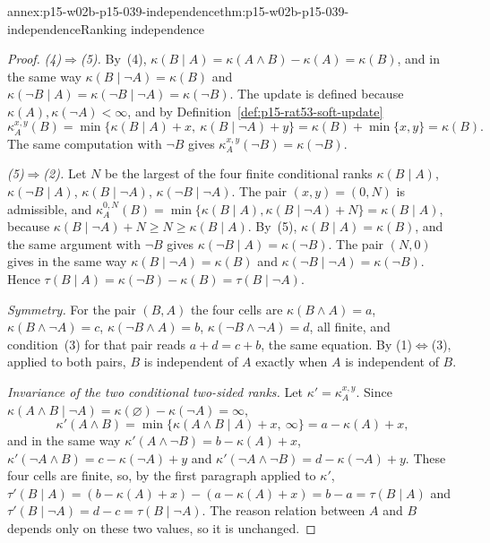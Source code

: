 \begin{annexitem}{annex:p15-w02b-p15-039-independence}{thm:p15-w02b-p15-039-independence}{Ranking independence}
\begin{proof}
\emph{(4)\(\Rightarrow\)(5).}  By~(4),
\(\kappa(B\mid A)=\kappa(A\land B)-\kappa(A)=\kappa(B)\), and in the same
way \(\kappa(B\mid\neg A)=\kappa(B)\) and
\(\kappa(\neg B\mid A)=\kappa(\neg B\mid\neg A)=\kappa(\neg B)\).  The
update is defined because \(\kappa(A),\kappa(\neg A)<\infty\), and by
Definition~\ref{def:p15-rat53-soft-update}
\[
 \kappa^{x,y}_A(B)=\min\{\kappa(B\mid A)+x,\ \kappa(B\mid\neg A)+y\}
 =\kappa(B)+\min\{x,y\}=\kappa(B).
\]
The same computation with \(\neg B\) gives \(\kappa^{x,y}_A(\neg B)=\kappa(\neg B)\).

\emph{(5)\(\Rightarrow\)(2).}  Let \(N\) be the largest of the four finite
conditional ranks \(\kappa(B\mid A)\), \(\kappa(\neg B\mid A)\),
\(\kappa(B\mid\neg A)\), \(\kappa(\neg B\mid\neg A)\).  The pair
\((x,y)=(0,N)\) is admissible, and
\(\kappa^{0,N}_A(B)=\min\{\kappa(B\mid A),\kappa(B\mid\neg A)+N\}=\kappa(B\mid A)\),
because \(\kappa(B\mid\neg A)+N\geq N\geq\kappa(B\mid A)\).  By~(5),
\(\kappa(B\mid A)=\kappa(B)\), and the same argument with \(\neg B\) gives
\(\kappa(\neg B\mid A)=\kappa(\neg B)\).  The pair \((N,0)\) gives in the
same way \(\kappa(B\mid\neg A)=\kappa(B)\) and
\(\kappa(\neg B\mid\neg A)=\kappa(\neg B)\).  Hence
\(\tau(B\mid A)=\kappa(\neg B)-\kappa(B)=\tau(B\mid\neg A)\).

\emph{Symmetry.}  For the pair \((B,A)\) the four cells are
\(\kappa(B\land A)=a\), \(\kappa(B\land\neg A)=c\),
\(\kappa(\neg B\land A)=b\), \(\kappa(\neg B\land\neg A)=d\), all finite,
and condition~(3) for that pair reads \(a+d=c+b\), the same equation.  By
(1)\(\Leftrightarrow\)(3), applied to both pairs, \(B\) is independent of
\(A\) exactly when \(A\) is independent of \(B\).

\emph{Invariance of the two conditional two-sided ranks.}  Let
\(\kappa'=\kappa^{x,y}_A\).  Since \(\kappa(A\land B\mid\neg A)
=\kappa(\varnothing)-\kappa(\neg A)=\infty\),
\[
 \kappa'(A\land B)=\min\{\kappa(A\land B\mid A)+x,\ \infty\}=a-\kappa(A)+x,
\]
and in the same way \(\kappa'(A\land\neg B)=b-\kappa(A)+x\),
\(\kappa'(\neg A\land B)=c-\kappa(\neg A)+y\) and
\(\kappa'(\neg A\land\neg B)=d-\kappa(\neg A)+y\).  These four cells are
finite, so, by the first paragraph applied to \(\kappa'\),
\(\tau'(B\mid A)=(b-\kappa(A)+x)-(a-\kappa(A)+x)=b-a=\tau(B\mid A)\) and
\(\tau'(B\mid\neg A)=d-c=\tau(B\mid\neg A)\).  The reason relation between
\(A\) and \(B\) depends only on these two values, so it is unchanged.
\end{proof}
\end{annexitem}

